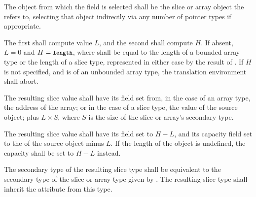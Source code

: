 \specsubsubitem
The object from which the field is selected shall be the slice or array object
the  refers to, selecting that object indirectly
via any number of pointer types if appropriate.

\specsubsubitem
The first  shall compute value $L$, and the second shall
compute $H$. If absent, $L = 0$ and $H = \mbox{\textup{\small\texttt{length}}}$, where 
shall be equal to the length of a bounded array type or the length of a slice
type, represented in either case by the result of
. If $H$ is not specified, and
 is of an unbounded array type, the translation
environment shall abort.

\specsubsubitem
The resulting slice value shall have its  field set from, in the case
of an array type, the address of the array; or in the case of a slice type, the
 value of the source object; plus $L \times S$, where $S$ is the
size of the slice or array's secondary type.

\specsubsubitem
The resulting slice value shall have its  field set to $H - L$,
and its capacity field set to the  of the source object minus $L$.
If the length of the object is undefined, the capacity shall be set to $H - L$
instead.

\specsubsubitem
The secondary type of the resulting slice type shall be equivalent to the
secondary type of the slice or array type given by
. The resulting slice type shall inherit the
 attribute from this type.


\begin{grammar}
 \\
	 \\
	 \\
	 \\

 \\
	  \terminal{(}  \terminal{,}  \terminal{)} \\
	  \terminal{(}  \terminal{,}   \terminal{)} \\
	  \terminal{(}  \terminal{,}  \terminal{,}  \terminal{)} \\
\end{grammar}


